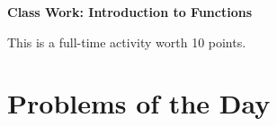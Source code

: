 \documentclass[11pt]{article}
\begin{document}
	
	\thispagestyle{empty}
	\renewcommand{\headrulewidth}{0.0pt}
	\thispagestyle{fancy}
	\lfoot{}
	\cfoot{}
	\rfoot{}	
	
	\vspace*{0in}

		\begin{center}
			\begin{large}
			\textbf{Class Work: Introduction to Functions} \\
			\end{large}
			This is a full-time activity worth 10 points. 
			
		\end{center}
		

\section*{Problems of the Day}
\end{document}
